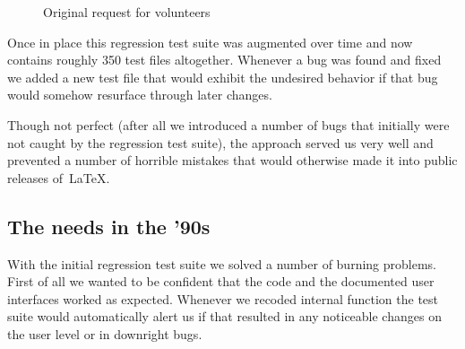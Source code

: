 \documentclass[a4paper]{ltugboat}
\begin{document}
\begin{figure}
\centering
{}
\caption{Original request for volunteers}\label{fig:volunteers}
\end{figure}

Once in place this regression test suite was augmented over time and
now contains roughly 350 test files altogether. Whenever a bug was
found and fixed we added a new test file that would exhibit the undesired behavior
if that bug would somehow resurface through later changes. 

Though not
perfect (after all we introduced a number of bugs that initially were
not caught by the regression test suite), the approach served us very
well and prevented a number of horrible mistakes that would otherwise
made it into public releases of~\LaTeX.

\subsection{The needs in the '90s}

With the initial regression test suite we solved a number of burning
problems. First of all we wanted to be confident that the code and the
documented user interfaces worked as expected. Whenever we recoded
internal function the test suite would automatically alert us if that
resulted in any noticeable changes on the user level or in downright
bugs. 
\end{document}
